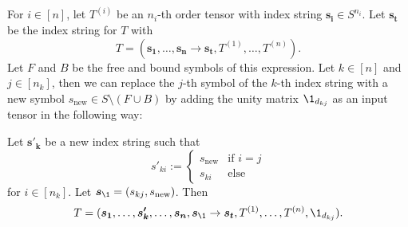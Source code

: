 \begin{lemma}
    \label{lemma:nested_einsum:1}
    For $i \in [n]$, let $T^{(i)}$ be an $n_i$-th order tensor with index string $\bm{s_i} \in S^{n_i}$.
    Let $\bm{s_t}$ be the index string for $T$ with
    $$T = (\bm{s_1}, \dots, \bm{s_n} \rightarrow \bm{s_t}, T^{(1)}, \dots, T^{(n)}).$$
    Let $F$ and $B$ be the free and bound symbols of this expression.
    Let $k \in [n]$ and $j \in [n_k]$, then we can replace the $j$-th symbol of the $k$-th index string with a new symbol $s_{\text{new}} \in S \setminus (F \cup B)$ by adding the unity matrix $\1_{d_{kj}}$ as an input tensor in the following way:

    Let $\bm{s'_k}$ be a new index string such that
    $$s'_{ki} := \begin{cases}
            s_{\text{new}} & \text{if $i = j$} \\
            s_{ki}         & \text{else}
        \end{cases}$$
    for $i \in [n_k]$.
    Let $\bm{s_\1} = (s_{kj}, s_{\text{new}})$.
    Then
    $$T = (\bm{s_1}, \dots, \bm{s'_k}, \dots, \bm{s_n}, \bm{s_\1} \rightarrow \bm{s_t}, T^{(1)}, \dots, T^{(n)}, \1_{d_{kj}}).$$
\end{lemma}


